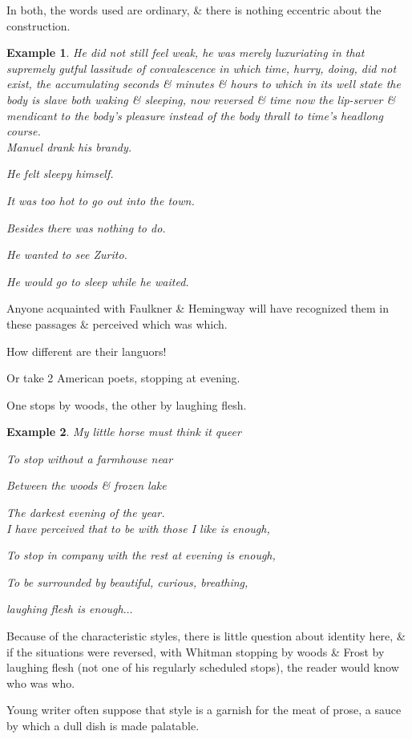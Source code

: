 \documentclass{article}
\newtheorem{example}{Example}
\begin{document}
In both, the words used are ordinary, \& there is nothing eccentric about the construction.
\begin{example}
	He did not still feel weak, he was merely luxuriating in that supremely gutful lassitude of convalescence in which time, hurry, doing, did not exist, the accumulating seconds \& minutes \& hours to which in its well state the body is slave both waking \& sleeping, now reversed \& time now the lip-server \& mendicant to the body's pleasure instead of the body thrall to time's headlong course.
	\\
	
	Manuel drank his brandy.
	
	He felt sleepy himself.
	
	It was too hot to go out into the town.
	
	Besides there was nothing to do.
	
	He wanted to see Zurito.
	
	He would go to sleep while he waited.
\end{example}
Anyone acquainted with Faulkner \& Hemingway will have recognized them in these passages \& perceived which was which.

How different are their languors!

%
Or take 2 American poets, stopping at evening.

One stops by woods, the other by laughing flesh.
\begin{example}
	My little horse must think it queer
	
	To stop without a farmhouse near
	
	Between the woods \& frozen lake
	
	The darkest evening of the year.
	\\
	
	I have perceived that to be with those I like is enough,
	
	To stop in company with the rest at evening is enough,
	
	To be surrounded by beautiful, curious, breathing,
	
	laughing flesh is enough$\ldots$
\end{example}
Because of the characteristic styles, there is little question about identity here, \& if the situations were reversed, with Whitman stopping by woods \& Frost by laughing flesh (not one of his regularly scheduled stops), the reader would know who was who.

%
Young writer often suppose that style is a garnish for the meat of prose, a sauce by which a dull dish is made palatable.
\end{document}
